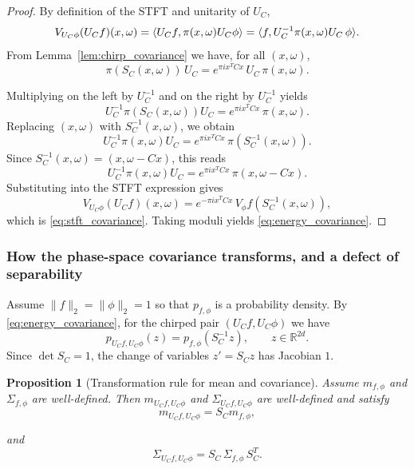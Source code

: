 \documentclass[final,1p,times,authoryear]{elsarticle}
\newtheorem{proposition}[theorem]{Proposition}
\theoremstyle{definition}
\newcommand{\R}{\mathbb{R}}
\newcommand{\1}{\mathbf{1}}
\DeclarePairedDelimiter{\inner}{\langle}{\rangle}
\begin{document}
\begin{proof}
By definition of the STFT and unitarity of $U_C$,
$$
V_{U_C\phi}(U_C f)(x,\omega)
=
\inner{U_C f,\pi(x,\omega)U_C\phi}
=
\inner{f, U_C^{-1}\pi(x,\omega)U_C\,\phi}.
$$
From Lemma~\ref{lem:chirp_covariance} we have, for all $(x,\omega)$,
$$
\pi(S_C(x,\omega))\,U_C
=
e^{\pi i x^T C x}\,U_C\,\pi(x,\omega).
$$

Multiplying on the left by $U_C^{-1}$ and on the right by $U_C^{-1}$ yields
$$
U_C^{-1}\pi(S_C(x,\omega))U_C
=
e^{\pi i x^T C x}\,\pi(x,\omega).
$$
Replacing $(x,\omega)$ with $S_C^{-1}(x,\omega)$, we obtain
$$
U_C^{-1}\pi(x,\omega)U_C
=
e^{\pi i x^T C x}\,\pi(S_C^{-1}(x,\omega)).
$$
Since $S_C^{-1}(x,\omega)=(x,\omega-Cx)$, this reads
$$
U_C^{-1}\pi(x,\omega)U_C
=
e^{\pi i x^T C x}\,\pi(x,\omega-Cx).
$$
Substituting into the STFT expression gives
$$
V_{U_C\phi}(U_C f)(x,\omega)
=
e^{-\pi i x^T C x}\,V_\phi f(S^{-1}_C(x,\omega)),
$$
which is \eqref{eq:stft_covariance}. Taking moduli yields \eqref{eq:energy_covariance}.
\end{proof}

\subsubsection{How the phase-space covariance transforms, and a defect of separability}
Assume $\|f\|_2=\|\phi\|_2=1$ so that $p_{f,\phi}$ is a probability density.
By \eqref{eq:energy_covariance}, for the chirped pair $(U_C f,U_C\phi)$ we have
\begin{equation}\label{eq:density_pullback}
p_{U_C f,U_C\phi}(z)=p_{f,\phi}(S_C^{-1} z),\qquad z\in\R^{2d}.
\end{equation}
Since $\det S_C=1$, the change of variables $z'=S_C z$ has Jacobian $1$.


\begin{proposition}[Transformation rule for mean and covariance]\label{prop:mean_cov_transform}
Assume $m_{f,\phi}$ and $\Sigma_{f,\phi}$ are well-defined. Then $m_{U_C f,U_C\phi}$ and
$\Sigma_{U_C f,U_C\phi}$ are well-defined and satisfy
\begin{equation}\label{eq:mean_transform}
m_{U_C f,U_C\phi}=S_C m_{f,\phi},
\end{equation}

and
\begin{equation}\label{eq:cov_transform}
\Sigma_{U_C f,U_C\phi}
=
S_C\,\Sigma_{f,\phi}\,S_C^T.
\end{equation}
\end{proposition}
\end{document}
